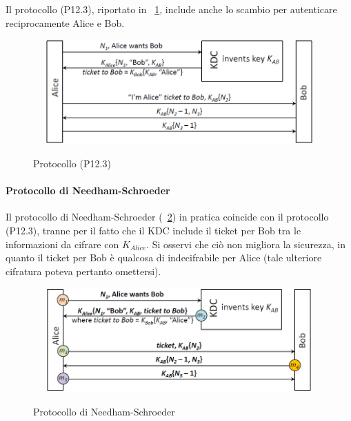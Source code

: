 Il protocollo (P12.3), riportato in \figurename~\ref{fig:ImgS109bis}, include anche lo scambio per autenticare reciprocamente Alice e Bob.
\begin{figure}[htbp]
	\centering%
	\subfigure%
	{\includegraphics[height=4cm, width=12cm, keepaspectratio]{Immagini/autenticazione/ImgS109bis.png}}
	\caption{Protocollo (P12.3)}\label{fig:ImgS109bis} 	
\end{figure}
\paragraph{Protocollo di Needham-Schroeder}
Il protocollo di Needham-Schroeder (\figurename~\ref{fig:ImgS111bis}) in pratica coincide con il protocollo (P12.3),  tranne per il fatto che il KDC include il ticket per Bob tra le informazioni da cifrare con $K_{Alice}$. Si osservi che ciò non migliora la sicurezza, in quanto il ticket per Bob è qualcosa di indecifrabile per Alice (tale ulteriore cifratura poteva pertanto omettersi).
\begin{figure}[htbp]
	\centering%
	\subfigure%
	{\includegraphics[height=4cm, width=12cm, keepaspectratio]{Immagini/autenticazione/ImgS111bis.png}}
	\caption{Protocollo di Needham-Schroeder}\label{fig:ImgS111bis} 	
\end{figure}

